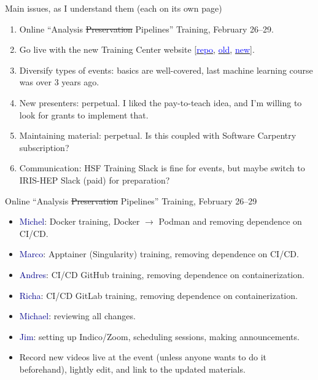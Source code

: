 \documentclass[aspectratio=169]{beamer}
\begin{document}
\begin{frame}{Main issues, as I understand them (each on its own page)}
\large
\vspace{0.5 cm}
\begin{enumerate}\setlength{\itemsep}{0.35 cm}
\item Online ``Analysis \sout{Preservation} Pipelines'' Training, February 26--29.
\item Go live with the new Training Center website [\href{https://github.com/hsf-training/training-center}{\textcolor{blue}{repo}}, \href{https://hepsoftwarefoundation.org/training/center.html}{\textcolor{blue}{old}}, \href{https://main--nimble-pothos-1ee962.netlify.app/}{\textcolor{blue}{new}}].
\item Diversify types of events: basics are well-covered, last machine learning course was over 3 years ago.
\item New presenters: perpetual. I liked the pay-to-teach idea, and I'm willing to look for grants to implement that.
\item Maintaining material: perpetual. Is this coupled with Software Carpentry subscription?
\item Communication: HSF Training Slack is fine for events, but maybe switch to IRIS-HEP Slack (paid) for preparation?
\end{enumerate}
\end{frame}

\begin{frame}{Online ``Analysis \sout{Preservation} Pipelines'' Training, February 26--29}
\vspace{0.5 cm}
\begin{itemize}\setlength{\itemsep}{0.2 cm}
\item \textcolor{darkblue}{Michel}: Docker training, Docker $\to$ Podman and removing dependence on CI/CD.
\item \textcolor{darkblue}{Marco}: Apptainer (Singularity) training, removing dependence on CI/CD.
\item \textcolor{darkblue}{Andres}: CI/CD GitHub training, removing dependence on containerization.
\item \textcolor{darkblue}{Richa}: CI/CD GitLab training, removing dependence on containerization.
\item \textcolor{darkblue}{Michael}: reviewing all changes.
\item \textcolor{darkblue}{Jim}: setting up Indico/Zoom, scheduling sessions, making announcements.
\item Record new videos live at the event (unless anyone wants to do it beforehand), lightly edit, and link to the updated materials.
\end{itemize}
\end{frame}
\end{document}
